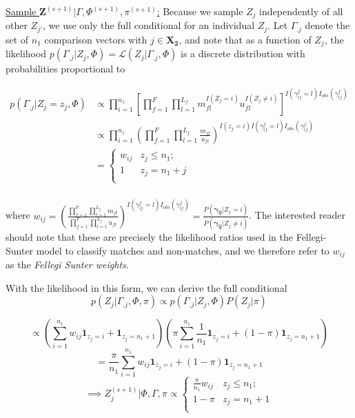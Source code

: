\documentclass[12pt,letterpaper]{article}
\newcommand{\1}[1]{\mathbb{I}\!\left[#1\right]} %
\begin{document}
\underline{Sample $\bm{Z}^{(s+1)}|\Gamma, \Phi^{(s+1)}, \pi^{(s+1)}$:}
Because we sample \(Z_j\) independently of all other \(Z_{j'}\), we use
only the full conditional for an individual \(Z_j\). Let \(\Gamma_{.j}\)
denote the set of \(n_1\) comparison vectors with \(j \in \bm{X_2}\), and note that as a function of \(Z_j\), the likelihood
\(p(\Gamma_{.j}|Z_j, \Phi) = \mathcal{L}(Z_j|\Gamma_{.j}, \Phi)\)
is a discrete distribution with probabilities proportional to

\begin{align*}
	p(\Gamma_{.j}|Z_j = z_j, \Phi) &\propto \prod_{i=1}^{n_1}\left[\prod_{f=1}^{F}\prod_{l=1}^{L_f} m_{fl}^{I(Z_j = i)}u_{fl}^{I(Z_j \neq i)}\right]^{I(\gamma_{ij}^f = l)I_{obs}(\gamma_{ij}^f)}\\
	&\propto \prod_{i=1}^{n_1}\left(\prod_{f=1}^{F}\prod_{l=1}^{L_f} \frac{m_{fl}}{u_{fl}}\right)^{I(z_j = i) I(\gamma_{ij}^f = l)I_{obs}(\gamma_{ij}^f)} \\
	&=
	\begin{cases} 
		w_{ij}  & z_j \leq n_1; \\
		1 &  z_j  = n_1 + j \\
	\end{cases}\\
\end{align*}

where
$w_{ij} = \left(\frac{\prod_{f=1}^{F}\prod_{l=1}^{L_f} m_{fl}}{\prod_{f=1}^{F}\prod_{l=1}^{L_f} u_{fl}}\right)^{I(\gamma_{ij}^f = l)I_{obs}(\gamma_{ij}^f)} = \frac{P(\boldsymbol{\gamma_{ij}}|Z_j = i)}{P(\boldsymbol{\gamma_{ij}} |Z_j \neq i)}$.
The interested reader should note that these are precisely the
likelihood ratios used in the Fellegi-Sunter model to classify matches
and non-matches, and we therefore refer to \(w_{ij}\) as the
\emph{Fellegi Sunter weights}.

With the likelihood in this form, we can derive the full conditional
\[p(Z_j|\Gamma_{.j}, \Phi, \pi) \propto p(\Gamma_{.j}| Z_j, \Phi) P(Z_j|\pi)\]

\[\propto \left(\sum_{i=1}^{n_1}w_{ij}\bm{1}_{z_j = i} + \bm{1}_{z_j = n_1 + 1}\right)\left(\pi\sum_{i=1}^{n_1}\frac{1}{n_1}\bm{1}_{z_j = i} + (1-\pi)\bm{1}_{z_j = n_1 + 1}\right)\]
\[= \frac{\pi}{n_1}\sum_{i=1}^{n_1}w_{ij}\bm{1}_{z_j = i} + (1-\pi)\bm{1}_{z_j = n_1 + 1} \]
\[ \implies Z_j^{(s+1)} | \Phi, \Gamma, \pi \propto
\begin{cases} 
	\frac{\pi}{n_1}w_{ij}   & z_j \leq n_1; \\
	1-\pi &  z_j  = n_1 + 1 \\
\end{cases}\]
\end{document}

